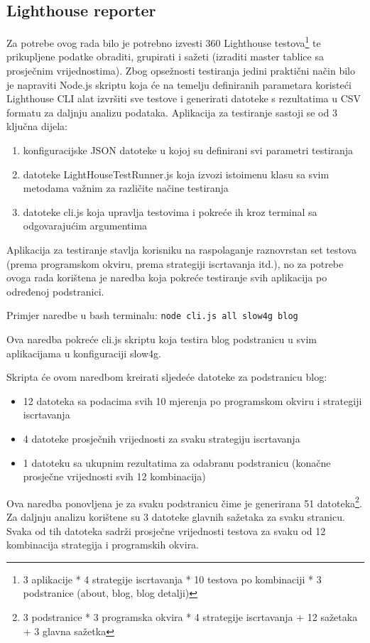 \subsection{Lighthouse reporter}

Za potrebe ovog rada bilo je potrebno izvesti 360 Lighthouse testova\footnote{3 aplikacije * 4 strategije iscrtavanja * 10 testova po kombinaciji * 3 podstranice (about, blog, blog detalji)} te prikupljene podatke obraditi, grupirati i sažeti (izraditi master tablice sa prosječnim vrijednostima). Zbog opsežnosti testiranja jedini praktični način bilo je napraviti Node.js skriptu koja će na temelju definiranih parametara koristeći Lighthouse CLI alat izvršiti sve testove i generirati datoteke s rezultatima u CSV formatu za daljnju analizu podataka.
Aplikacija za testiranje sastoji se od 3 ključna dijela:
\begin{enumerate}
    \item konfiguracijske JSON datoteke u kojoj su definirani svi parametri testiranja
    \item datoteke LightHouseTestRunner.js koja izvozi istoimenu klasu sa svim metodama važnim za različite načine testiranja
    \item datoteke cli.js koja upravlja testovima i pokreće ih kroz terminal sa odgovarajućim argumentima
\end{enumerate}

Aplikacija za testiranje stavlja korisniku na raspolaganje raznovrstan set testova (prema programskom okviru, prema strategiji iscrtavanja itd.), no za potrebe ovoga rada korištena je naredba koja pokreće testiranje svih aplikacija po određenoj podstranici.

\bigskip

Primjer naredbe u bash terminalu:
\texttt{node cli.js all slow4g blog}

Ova naredba pokreće cli.js skriptu koja testira blog podstranicu u svim aplikacijama u konfiguraciji slow4g.

\bigskip
Skripta će ovom naredbom kreirati sljedeće datoteke za podstranicu blog:
\begin{itemize}
    \item 12 datoteka sa podacima svih 10 mjerenja po programskom okviru i strategiji iscrtavanja
    \item 4 datoteke prosječnih vrijednosti za svaku strategiju iscrtavanja
    \item 1 datoteku sa ukupnim rezultatima za odabranu podstranicu (konačne prosječne vrijednosti svih 12 kombinacija)
\end{itemize}
Ova naredba ponovljena je za svaku podstranicu čime je generirana 51 datoteka\footnote{3 podstranice * 3 programska okvira * 4 strategije iscrtavanja + 12 sažetaka + 3 glavna sažetka}.
Za daljnju analizu korištene su 3 datoteke glavnih sažetaka za svaku stranicu. Svaka od tih datoteka sadrži prosječne vrijednosti testova za svaku od 12 kombinacija strategija i programskih okvira.

